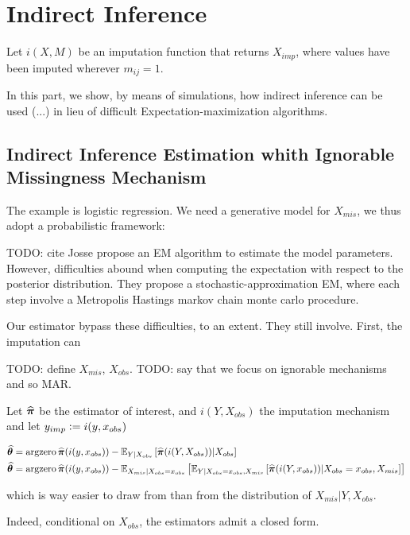 \documentclass{article}
\begin{document}
\section{Indirect Inference}
Let $i(X, M)$ be an imputation function that returns $X_{imp}$, where values have been imputed wherever $m_{ij} = 1$. 

In this part, we show, by means of simulations, how indirect inference can be used (...) in lieu of difficult Expectation-maximization algorithms.

\subsection{Indirect Inference Estimation whith Ignorable Missingness Mechanism}




The example is logistic regression. We need a generative model for $X_{mis}$, we thus adopt a probabilistic framework:

TODO: cite Josse propose an EM algorithm to estimate the model parameters. However, difficulties abound when computing the expectation with respect to the posterior distribution. They propose a stochastic-approximation EM, where each step involve a Metropolis Hastings markov chain monte carlo procedure. 

Our estimator bypass these difficulties, to an extent. They still involve.   First, the imputation can 

TODO: define $X_{mis}$, $X_{obs}$.
TODO: say that we focus on ignorable mechanisms and so MAR.

Let $\widehat{{\bm{\pi}}}$ be the estimator of interest, and $i(Y, X_{obs})$ the imputation mechanism and let $y_{imp} \vcentcolon= i(y, x_{obs})$


\begin{align*}
    \widehat{{\bm{\theta}}} &= \operatorname*{argzero} \widehat{{\bm{\pi}}}(i(y, x_{obs}))- \mathbb E_{Y|X_{obs}}\left[\widehat{{\bm{\pi}}}(i(Y, X_{obs}))\large|X_{obs}\right]\\
    \widehat{{\bm{\theta}}} &= \operatorname*{argzero} \widehat{{\bm{\pi}}}(i(y, x_{obs}))- \mathbb E_{X_{mis}|X_{obs}=x_{obs}}\left[\mathbb E_{Y|X_{obs}=x_{obs}, X_{mis}}\left[\widehat{{\bm{\pi}}}(i(Y, x_{obs}))\large|X_{obs}=x_{obs}, X_{mis}\right]\right]
\end{align*}

which is way easier to draw from than from the distribution of $X_{mis}|Y, X_{obs}$.


Indeed, conditional on $X_{obs}$, the estimators admit a closed form. 
\end{document}

